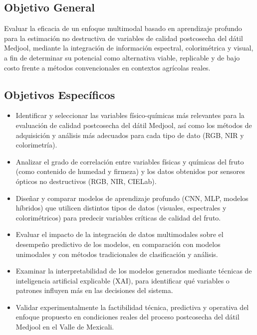 \subsection{Objetivo General}

Evaluar la eficacia de un enfoque multimodal basado en aprendizaje profundo para la estimación no destructiva de variables de calidad postcosecha del dátil Medjool, mediante la integración de información espectral, colorimétrica y visual, a fin de determinar su potencial como alternativa viable, replicable y de bajo costo frente a métodos convencionales en contextos agrícolas reales.

\subsection{Objetivos Específicos}

\begin{itemize}
    \item Identificar y seleccionar las variables físico-químicas más relevantes para la evaluación de calidad postcosecha del dátil Medjool, así como los métodos de adquisición y análisis más adecuados para cada tipo de dato (RGB, NIR y colorimetría).
    \item Analizar el grado de correlación entre variables físicas y químicas del fruto (como contenido de humedad y firmeza) y los datos obtenidos por sensores ópticos no destructivos (RGB, NIR, CIELab).
    \item Diseñar y comparar modelos de aprendizaje profundo (CNN, MLP, modelos híbridos) que utilicen distintos tipos de datos (visuales, espectrales y colorimétricos) para predecir variables críticas de calidad del fruto.
    \item Evaluar el impacto de la integración de datos multimodales sobre el desempeño predictivo de los modelos, en comparación con modelos unimodales y con métodos tradicionales de clasificación y análisis.
    \item Examinar la interpretabilidad de los modelos generados mediante técnicas de inteligencia artificial explicable (XAI), para identificar qué variables o patrones influyen más en las decisiones del sistema.
    \item Validar experimentalmente la factibilidad técnica, predictiva y operativa del enfoque propuesto en condiciones reales del proceso postcosecha del dátil Medjool en el Valle de Mexicali.
\end{itemize}


